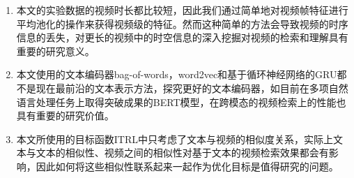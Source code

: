     \begin{enumerate}[\hspace{2em}1.]
        \item 本文的实验数据的视频时长都比较短，因此我们通过简单地对视频帧特征进行平均池化的操作来获得视频级的特征。然而这种简单的方法会导致视频的时序信息的丢失，对更长的视频中的时空信息的深入挖掘对视频的检索和理解具有重要的研究意义。

        \item 本文使用的文本编码器bag-of-words，word2vec和基于循环神经网络的GRU都不是现在最前沿的文本表示方法，探究更好的文本编码器，如目前在多项自然语言处理任务上取得突破成果的BERT模型，在跨模态的视频检索上的性能也具有重要的研究价值。

        \item 本文所使用的目标函数ITRL中只考虑了文本与视频的相似度关系，实际上文本与文本的相似性、视频之间的相似性对基于文本的视频检索效果都会有影响，因此如何将这些相似性联系起来一起作为优化目标是值得研究的问题。

    \end{enumerate}
